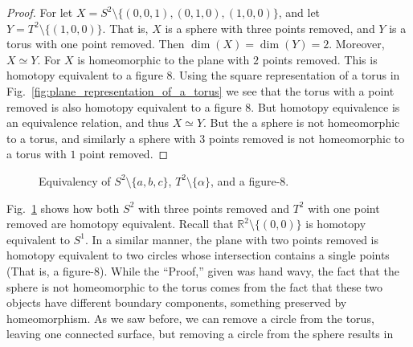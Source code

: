             \begin{proof}
                For let $X=S^{2}\setminus\{(0,0,1),(0,1,0),(1,0,0)\}$, and let
                $Y=T^{2}\setminus\{(1,0,0)\}$. That is, $X$ is a sphere with
                three points removed, and $Y$ is a torus with one point removed.
                Then $\dim(X)=\dim(Y)=2$. Moreover, $X\simeq Y$. For $X$ is
                homeomorphic to the plane with $2$ points removed. This is
                homotopy equivalent to a figure $8$. Using the square
                representation of a torus in
                Fig.~\ref{fig:plane_representation_of_a_torus} we see that the
                torus with a point removed is also homotopy equivalent to a
                figure $8$. But homotopy equivalence is an equivalence relation,
                and thus $X\simeq Y$. But the a sphere is not homeomorphic to a
                torus, and similarly a sphere with $3$ points removed is not
                homeomorphic to a torus with $1$ point removed.
            \end{proof}
            \begin{figure}[H]
                    \centering
                    \captionsetup{type=figure}
                    \resizebox{\textwidth}{!}{%
                    }
                    \caption{Equivalency of $S^{2}\setminus\{a,b,c\}$,
                             $T^{2}\setminus\{\alpha\}$, and a figure-8.}
                    \label{fig:homotopy_equivalence_sphere_%
                           with_3_holes_torus_with_1_hole}
            \end{figure} 
            Fig.~\ref{fig:homotopy_equivalence_sphere_%
                           with_3_holes_torus_with_1_hole} shows how both
            $S^{2}$ with three points removed and $T^{2}$ with one point removed
            are homotopy equivalent. Recall that
            $\mathbb{R}^{2}\setminus \{(0,0)\}$ is homotopy equivalent to
            $S^{1}$. In a similar manner, the plane with two points removed is
            homotopy equivalent to two circles whose intersection contains a
            single points (That is, a figure-$8$). While the ``Proof,'' given
            was hand wavy, the fact that the sphere is not homeomorphic to the
            torus comes from the fact that these two objects have different
            boundary components, something preserved by homeomorphism. As we
            saw before, we can remove a circle from the torus, leaving one
            connected surface, but removing a circle from the sphere results in 
